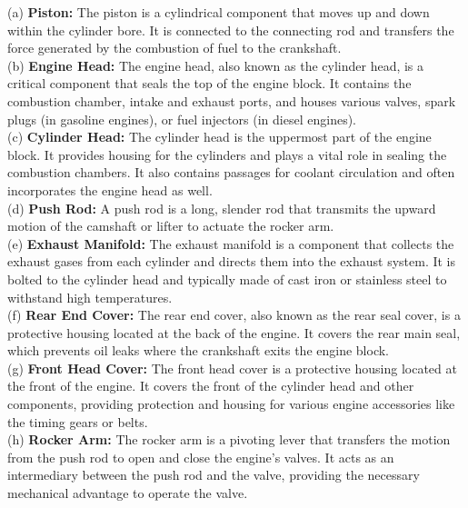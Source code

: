 \documentclass[12pt]{article}
\begin{document}
(a) \textbf{Piston:} The piston is a cylindrical component that moves up and down within the cylinder bore. It is connected to the connecting rod and transfers the force generated by the combustion of fuel to the crankshaft.\\

(b) \textbf{Engine Head:} The engine head, also known as the cylinder head, is a critical component that seals the top of the engine block. It contains the combustion chamber, intake and exhaust ports, and houses various valves, spark plugs (in gasoline engines), or fuel injectors (in diesel engines).\\

(c) \textbf{Cylinder Head:} The cylinder head is the uppermost part of the engine block. It provides housing for the cylinders and plays a vital role in sealing the combustion chambers. It also contains passages for coolant circulation and often incorporates the engine head as well.\\

(d) \textbf{Push Rod:} A push rod is a long, slender rod that transmits the upward motion of the camshaft or lifter to actuate the rocker arm. \\

(e) \textbf{Exhaust Manifold:} The exhaust manifold is a component that collects the exhaust gases from each cylinder and directs them into the exhaust system. It is bolted to the cylinder head and typically made of cast iron or stainless steel to withstand high temperatures.\\

(f) \textbf{Rear End Cover:} The rear end cover, also known as the rear seal cover, is a protective housing located at the back of the engine. It covers the rear main seal, which prevents oil leaks where the crankshaft exits the engine block.\\

(g) \textbf{Front Head Cover:} The front head cover is a protective housing located at the front of the engine. It covers the front of the cylinder head and other components, providing protection and housing for various engine accessories like the timing gears or belts.\\

(h) \textbf{Rocker Arm:} The rocker arm is a pivoting lever that transfers the motion from the push rod to open and close the engine's valves. It acts as an intermediary between the push rod and the valve, providing the necessary mechanical advantage to operate the valve.\\
\end{document}
